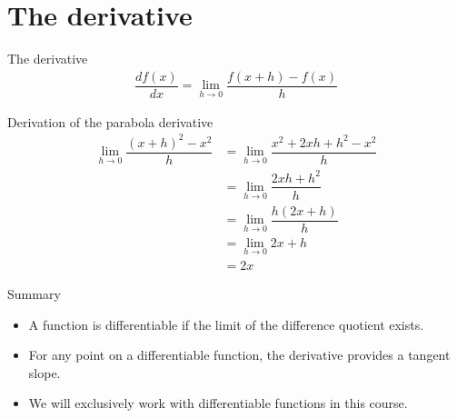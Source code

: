 \documentclass[notes]{beamer}
\begin{document}
    \section{The derivative}
    \begin{frame}{The derivative}
      \begin{align}
        \dfrac{d f(x)}{dx} = \lim_{h \rightarrow 0} \dfrac{f(x + h) - f(x)}{h}
      \end{align}
      \begin{figure}
        
      \end{figure}
    \end{frame}

    
    \begin{frame}{Derivation of the parabola derivative}
      \begin{align}
          \lim_{h \rightarrow 0} \dfrac{(x + h)^2 - x^2}{h} 
          & = \lim_{h \rightarrow 0} \dfrac{x^2 + 2xh + h^2 - x^2}{h}   \\
          & = \lim_{h \rightarrow 0} \dfrac{2xh + h^2}{h}  \\
          & = \lim_{h \rightarrow 0} \dfrac{h (2x + h)}{h}  \\
          & = \lim_{h \rightarrow 0} 2x + h \\
          & = 2x
      \end{align}
    \end{frame}

    \begin{frame}{Summary}
      \begin{itemize}
        \item A function is differentiable if the limit of the difference quotient exists.
        \item For any point on a differentiable function, the derivative provides a tangent slope.
        \item We will exclusively work with differentiable functions in this course.
      \end{itemize}
    \end{frame}
\end{document}
